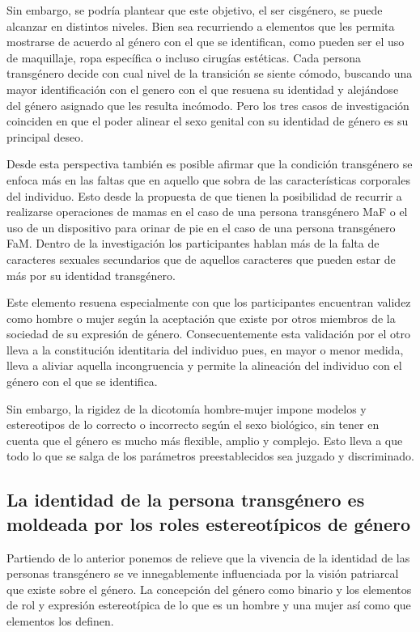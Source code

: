 Sin embargo, se podría plantear que este objetivo, el ser cisgénero, se puede
alcanzar en distintos niveles. Bien sea recurriendo a elementos que les permita
mostrarse de acuerdo al género con el que se identifican, como pueden ser el uso
de maquillaje, ropa específica o incluso cirugías estéticas. Cada persona
transgénero decide con cual nivel de la transición se siente cómodo, buscando
una mayor identificación con el genero con el que resuena su identidad y
alejándose del género  asignado que les resulta incómodo. Pero los tres casos de
investigación coinciden en que el poder alinear el sexo genital con su identidad
de género es su principal deseo.

Desde esta perspectiva también es posible afirmar que la condición transgénero
se enfoca más en las faltas que en aquello que sobra de las características
corporales del individuo. Esto desde la propuesta de que tienen la posibilidad
de recurrir a realizarse operaciones de mamas en el caso de una persona
transgénero MaF o el uso de un dispositivo para orinar de pie en el caso de una
persona transgénero FaM. Dentro de la investigación los participantes hablan más
de la falta de caracteres sexuales secundarios que de aquellos caracteres que
pueden estar de más por su identidad transgénero.

Este elemento resuena especialmente con que los
participantes encuentran validez como hombre o mujer según la aceptación
que existe por otros miembros de la sociedad de su expresión de género.
Consecuentemente esta validación por el otro lleva a la constitución
identitaria del individuo pues, en mayor o menor medida, lleva a aliviar
aquella incongruencia y permite la alineación del individuo con el género con el
que se identifica.

Sin embargo, la rigidez de la dicotomía hombre-mujer impone modelos y
estereotipos de lo correcto o incorrecto según el sexo biológico, sin tener en
cuenta que el género es mucho más flexible, amplio y complejo. Esto lleva a que
todo lo que se salga de los parámetros preestablecidos sea juzgado y
discriminado.

\subsection[La identidad es moldeada por el patriarcado]{La identidad de la persona
transgénero es moldeada por los roles estereotípicos de género}

Partiendo de lo anterior ponemos de relieve que la vivencia de la identidad de
las personas transgénero se ve innegablemente influenciada por la visión
patriarcal que existe sobre el género. La concepción del género como binario y
los elementos de rol y expresión estereotípica de lo que es un hombre y una
mujer así como que elementos los definen.

